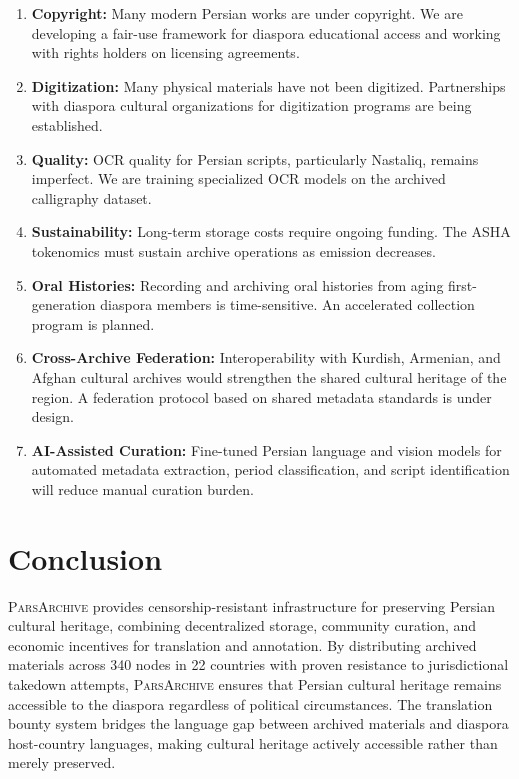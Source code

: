 \documentclass[11pt,a4paper]{article}
\newcommand{\parsarch}{\textsc{ParsArchive}\xspace}
\begin{document}
\begin{enumerate}
    \item \textbf{Copyright:} Many modern Persian works are under copyright. We are developing a fair-use framework for diaspora educational access and working with rights holders on licensing agreements.
    \item \textbf{Digitization:} Many physical materials have not been digitized. Partnerships with diaspora cultural organizations for digitization programs are being established.
    \item \textbf{Quality:} OCR quality for Persian scripts, particularly Nastaliq, remains imperfect. We are training specialized OCR models on the archived calligraphy dataset.
    \item \textbf{Sustainability:} Long-term storage costs require ongoing funding. The ASHA tokenomics must sustain archive operations as emission decreases.
    \item \textbf{Oral Histories:} Recording and archiving oral histories from aging first-generation diaspora members is time-sensitive. An accelerated collection program is planned.
    \item \textbf{Cross-Archive Federation:} Interoperability with Kurdish, Armenian, and Afghan cultural archives would strengthen the shared cultural heritage of the region. A federation protocol based on shared metadata standards is under design.
    \item \textbf{AI-Assisted Curation:} Fine-tuned Persian language and vision models for automated metadata extraction, period classification, and script identification will reduce manual curation burden.
\end{enumerate}

\section{Conclusion}

\parsarch provides censorship-resistant infrastructure for preserving Persian cultural heritage, combining decentralized storage, community curation, and economic incentives for translation and annotation. By distributing archived materials across 340 nodes in 22 countries with proven resistance to jurisdictional takedown attempts, \parsarch ensures that Persian cultural heritage remains accessible to the diaspora regardless of political circumstances. The translation bounty system bridges the language gap between archived materials and diaspora host-country languages, making cultural heritage actively accessible rather than merely preserved.
\end{document}
